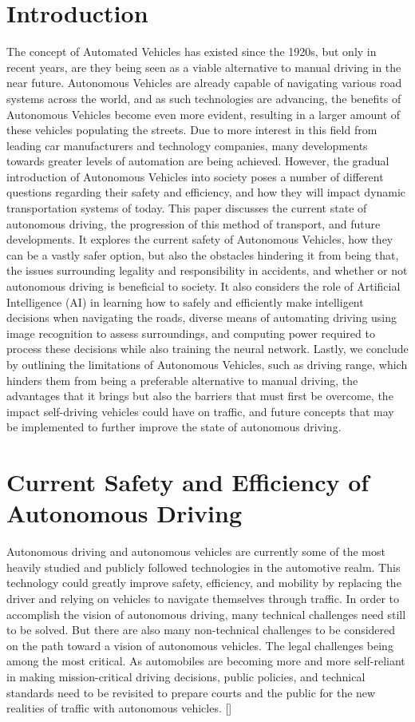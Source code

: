 \documentclass{article}
\begin{document}
\section{Introduction}
The concept of Automated Vehicles has existed since the 1920s, but only in recent years, are they being seen as a viable alternative to manual driving in the near future. Autonomous Vehicles are already capable of navigating various road systems across the world, and as such technologies are advancing, the benefits of Autonomous Vehicles become even more evident, resulting in a larger amount of these vehicles populating the streets. Due to more interest in this field from leading car manufacturers and technology companies, many developments towards greater levels of automation are being achieved. However, the gradual introduction of Autonomous Vehicles into society poses a number of different questions regarding their safety and efficiency, and how they will impact dynamic transportation systems of today. 
\bigbreak
This paper discusses the current state of autonomous driving, the progression of this method of transport, and future developments. It explores the current safety of Autonomous Vehicles, how they can be a vastly safer option, but also the obstacles hindering it from being that, the issues surrounding legality and responsibility in accidents, and whether or not autonomous driving is beneficial to society. It also considers the role of Artificial Intelligence (AI) in learning how to safely and efficiently make intelligent decisions when navigating the roads, diverse means of automating driving using image recognition to assess surroundings, and computing power required to process these decisions while also training the neural network. Lastly, we conclude by outlining the limitations of Autonomous Vehicles, such as driving range, which hinders them from being a preferable alternative to manual driving, the advantages that it brings but also the barriers that must first be overcome, the impact self-driving vehicles could have on traffic, and future concepts that may be implemented to further improve the state of autonomous driving.

\section{Current Safety and Efficiency of Autonomous Driving}

Autonomous driving and autonomous vehicles are currently some of the most heavily studied and publicly followed technologies in the automotive realm. This technology could greatly improve safety, efficiency, and mobility by replacing the driver and relying on vehicles to navigate themselves through traffic. In order to accomplish the vision of autonomous driving, many technical challenges need still to be solved. But there are also many non-technical challenges to be considered on the path toward a vision of autonomous vehicles. The legal challenges being among the most critical. As automobiles are becoming more and more self-reliant in making mission-critical driving decisions, public policies, and technical standards need to be revisited to prepare courts and the public for the new realities of traffic with autonomous vehicles. [\textcite{beiker2012legal}]
\end{document}
